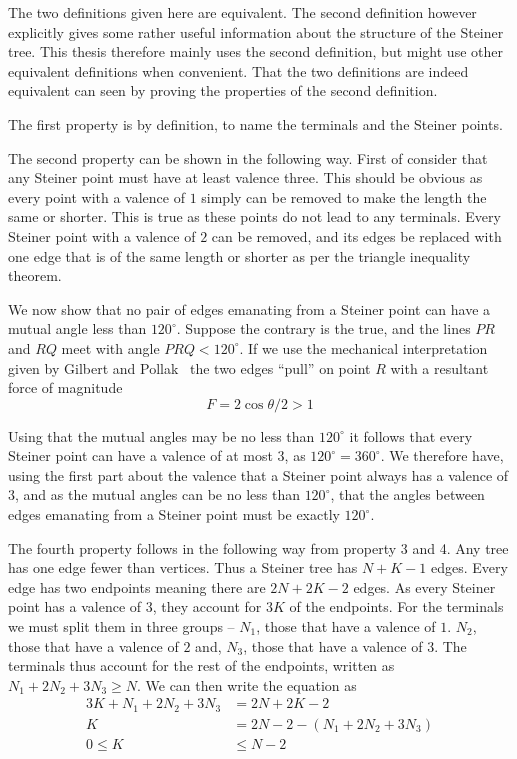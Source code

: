 The two definitions given here are equivalent.  The second definition however
explicitly gives some rather useful information about the structure of the
Steiner tree.  This thesis therefore mainly uses the second definition, but
might use other equivalent definitions when convenient. That the two definitions
are indeed equivalent can seen by proving the properties of the second
definition.

The first property is by definition, to name the terminals and the
Steiner points.

The second property can be shown in the following way.  First of consider that
any Steiner point must have at least valence three.  This should be obvious as
every point with a valence of $1$ simply can be removed to make the length the
same or shorter.  This is true as these points do not lead to any terminals.
Every Steiner point with a valence of $2$ can be removed, and its edges be
replaced with one edge that is of the same length or shorter as per the triangle
inequality theorem.

We now show that no pair of edges emanating from a Steiner point can have a
mutual angle less than $120^{\circ}$.  Suppose the contrary is the true, and the
lines $PR$ and $RQ$ meet with angle $PRQ < 120^{\circ}$.  If we use the
mechanical interpretation given by Gilbert and Pollak~\cite{Gilbert1968} the two
edges ``pull'' on point $R$ with a resultant force of magnitude
%
\begin{equation}
F = 2 \cos \theta / 2 > 1
\end{equation}
%

Using that the mutual angles may be no less than $120^{\circ}$ it follows that
every Steiner point can have a valence of at most $3$, as
$120^{\circ} = 360^{\circ}$.  We therefore have, using the first part about the
valence that a Steiner point always has a valence of $3$, and as the mutual angles
can be no less than $120^{\circ}$, that the angles between edges emanating from
a Steiner point must be exactly $120^{\circ}$.


The fourth property follows in the following way from property 3 and 4.  Any
tree has one edge fewer than vertices.  Thus a Steiner tree has $N+K-1$ edges.
Every edge has two endpoints meaning there are $2N+2K-2$ edges.  As every
Steiner point has a valence of $3$, they account for $3K$ of the endpoints.  For
the terminals we must split them in three groups -- $N_1$, those that have a
valence of $1$.  $N_2$, those that have a valence of $2$ and, $N_3$, those that
have a valence of $3$.  The terminals thus account for the rest of the
endpoints, written as $N_1 + 2 N_2 + 3 N_3 \ge N$.  We can then write the
equation as
%
\begin{align}
  3K + N_1 + 2N_2 + 3N_3 &= 2N + 2K - 2 \\
  K &= 2N - 2 - (N_1 + 2N_2 + 3N_3) \\
  0 \le K &\le N - 2
\end{align}

